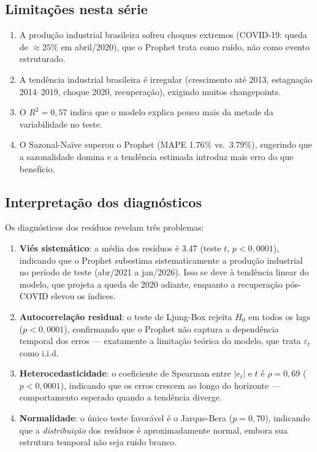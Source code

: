 \documentclass[12pt, a4paper]{article}
\begin{document}
\subsection{Limitações nesta série}
\begin{enumerate}[nosep, leftmargin=*]
    \item A produção industrial brasileira sofreu choques extremos
    (COVID-19: queda de $\approx 25\%$ em abril/2020), que o
    Prophet trata como ruído, não como evento estruturado.
    \item A tendência industrial brasileira é irregular (crescimento
    até 2013, estagnação 2014--2019, choque 2020, recuperação),
    exigindo muitos changepoints.
    \item O $R^2 = 0{,}57$ indica que o modelo explica pouco mais
    da metade da variabilidade no teste.
    \item O Sazonal-Naïve superou o Prophet (MAPE 1.76\% vs.\
    3.79\%), sugerindo que a sazonalidade domina e a tendência
    estimada introduz mais erro do que benefício.
\end{enumerate}

\subsection{Interpretação dos diagnósticos}

Os diagnósticos dos resíduos revelam três problemas:

\begin{enumerate}[nosep, leftmargin=*]
    \item \textbf{Viés sistemático}: a média dos resíduos é 3.47
    (teste $t$, $p < 0{,}0001$), indicando que o Prophet subestima
    sistematicamente a produção industrial no período de teste
    (abr/2021 a jan/2026). Isso se deve à tendência linear do
    modelo, que projeta a queda de 2020 adiante, enquanto a
    recuperação pós-COVID elevou os índices.

    \item \textbf{Autocorrelação residual}: o teste de Ljung-Box
    rejeita $H_0$ em todos os lags ($p < 0{,}0001$), confirmando
    que o Prophet não captura a dependência temporal dos erros ---
    exatamente a limitação teórica do modelo, que trata
    $\varepsilon_t$ como i.i.d.

    \item \textbf{Heterocedasticidade}: o coeficiente de Spearman
    entre $|e_t|$ e $t$ é $\rho = 0{,}69$ ($p < 0{,}0001$),
    indicando que os erros crescem ao longo do horizonte ---
    comportamento esperado quando a tendência diverge.

    \item \textbf{Normalidade}: o único teste favorável é o
    Jarque-Bera ($p = 0{,}70$), indicando que a \textit{distribuição}
    dos resíduos é aproximadamente normal, embora sua estrutura
    temporal não seja ruído branco.
\end{enumerate}
\end{document}
